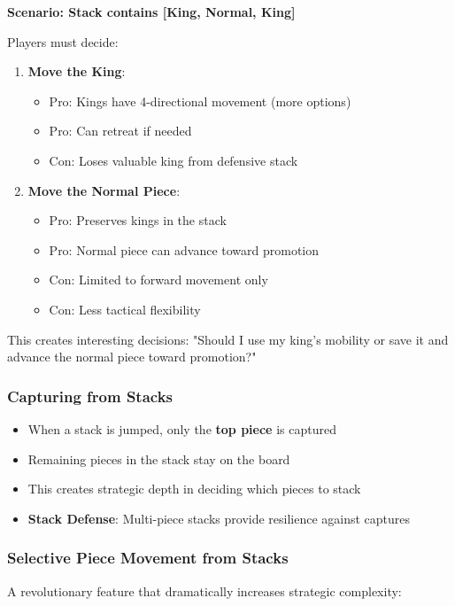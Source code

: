 \documentclass[12pt,a4paper]{article}
\begin{document}
\textbf{Scenario: Stack contains [King, Normal, King]}

Players must decide:
\begin{enumerate}
    \item \textbf{Move the King}: 
    \begin{itemize}
        \item Pro: Kings have 4-directional movement (more options)
        \item Pro: Can retreat if needed
        \item Con: Loses valuable king from defensive stack
    \end{itemize}
    
    \item \textbf{Move the Normal Piece}:
    \begin{itemize}
        \item Pro: Preserves kings in the stack
        \item Pro: Normal piece can advance toward promotion
        \item Con: Limited to forward movement only
        \item Con: Less tactical flexibility
    \end{itemize}
\end{enumerate}

This creates interesting decisions: "Should I use my king's mobility or save it and advance the normal piece toward promotion?"

\subsubsection{Capturing from Stacks}
\begin{itemize}
    \item When a stack is jumped, only the \textbf{top piece} is captured
    \item Remaining pieces in the stack stay on the board
    \item This creates strategic depth in deciding which pieces to stack
    \item \textbf{Stack Defense}: Multi-piece stacks provide resilience against captures
\end{itemize}

\subsubsection{Selective Piece Movement from Stacks}

A revolutionary feature that dramatically increases strategic complexity:
\end{document}
